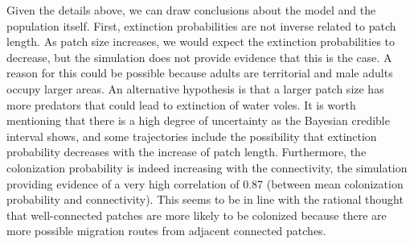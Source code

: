 \documentclass[12pt,a4paper]{article}
\begin{document}
Given the details above, we can draw conclusions about the model and the population itself. First, extinction probabilities are not inverse related to patch length. As patch size increases, we would expect the extinction probabilities to decrease, but the simulation does not provide evidence that this is the case. A reason for this could be possible because adults are territorial and male adults occupy larger areas. An alternative hypothesis is that a larger patch size has more predators that could lead to extinction of water voles. It is worth mentioning that there is a high degree of uncertainty as the Bayesian credible interval shows, and some trajectories include the possibility that extinction probability decreases with the increase of patch length. Furthermore, the colonization probability is indeed increasing with the connectivity, the simulation providing evidence of a very high correlation of 0.87 (between mean colonization probability and connectivity). This seems to be in line with the rational thought that well-connected patches are more likely to be colonized because there are more possible migration routes from adjacent connected patches.
\end{document}
